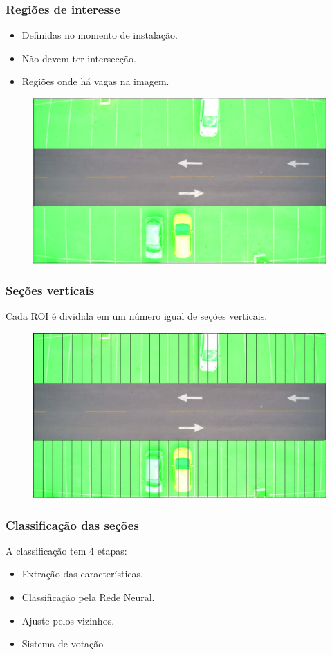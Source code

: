 \documentclass{beamer}
\begin{document}
\begin{frame}
\frametitle{Regiões de interesse}
\begin{block}{}
\begin{itemize}
\item Definidas no momento de instalação.
\item Não devem ter intersecção.
\item Regiões onde há vagas na imagem.
\end{itemize} 
\end{block}
\begin{figure}
	\centering
	\includegraphics[width=.4\textwidth]{ROIs}
	\centering
\end{figure}
\end{frame}

\begin{frame}
\frametitle{Seções verticais}
\begin{block}{}
Cada ROI é dividida em um número igual de seções verticais.
\end{block}
\begin{figure}
	\centering
	\includegraphics[width=.4\textwidth]{Secoes}
	\centering
\end{figure}

\end{frame}


\begin{frame}
\frametitle{Classificação das seções}
	A classificação tem 4 etapas:
   \begin{itemize}
      \item Extração das características.
      \item Classificação pela Rede Neural.
      \item Ajuste pelos vizinhos.
      \item Sistema de votação
    \end{itemize}
\end{frame}
\end{document}
